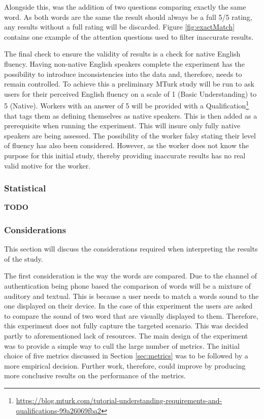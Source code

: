 Alongside this, was the addition of two questions comparing exactly the same word. As both words are the same the result should always be a full 5/5 rating, any results without a full rating will be discarded. Figure \ref{fig:exactMatch} contains one example of the attention questions used to filter inaccurate results.

The final check to ensure the validity of results is a check for native 
English fluency. Having non-native English speakers complete the 
experiment has the possibility to introduce inconsistencies into the 
data and, therefore, needs to remain controlled. To achieve this a 
preliminary MTurk study will be run to ask users for their perceived 
English fluency on a scale of 1 (Basic Understanding) to 5 (Native). 
Workers with an answer of 5 will be provided with a 
Qualification\footnote{\url{https://blog.mturk.com/tutorial-understanding-requirements-and-qualifications-99a26069fba2}} 
that tags them as defining themselves as native speakers. This is then 
added as a prerequisite when running the experiment. This will insure 
only fully native speakers are being assessed. The possibility of the 
worker falsy stating their level of fluency has also been considered. 
However, as the worker does not know the purpose for this initial study,
thereby providing inaccurate results has no real valid motive for the 
worker.

\subsubsection{Statistical}
\textbf{TODO}

\subsubsection{Considerations}
This section will discuss the considerations required when interpreting the results of the study.

The first consideration is the way the words are compared. Due to the channel of authentication being phone based the comparison of words will be a mixture of auditory and textual. This is because a user needs to match a words sound to the one displayed on their device. In the case of this experiment the users are asked to compare the sound of two word that are visually displayed to them. Therefore, this experiment does not fully capture the targeted scenario. This was decided partly to aforementioned lack of resources. The main design of the experiment was to provide a simple way to cull the large number of metrics. The initial choice of five metrics discussed in Section \ref{sec:metrics} was to be followed by a more empirical decision. Further work, therefore, could improve by producing more conclusive results on the performance of the metrics.


